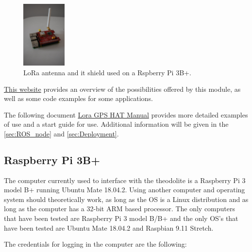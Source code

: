 \documentclass[10pt,letterpaper,oneside]{article}
\begin{document}
\begin{figure}[htb]
	\centering
	\includegraphics[width=0.2\textwidth]{./figs/LoRa_antenna.JPG}
	\caption{LoRa antenna and it shield used on a Rspberry Pi 3B+.}
	\label{fig:LORA}
\end{figure}

\href{https://wiki.dragino.com/index.php?title=Lora/GPS_HAT}{This website} provides an overview of the possibilities offered by this module, as well as some code examples for some applications.

The following document \href{run:Lora_gps_hat_manual.pdf}{Lora GPS HAT Manual} provides more detailed examples of use and a start guide for use.
Additional information will be given in the \autoref{sec:ROS_node} and \autoref{sec:Deployment}.

%

\subsection{Raspberry Pi 3B+}

The computer currently used to interface with the theodolite is a Raspberry Pi 3 model B+ running Ubuntu Mate 18.04.2. 
Using another computer and operating system should theoretically work, as long as the OS is a Linux distribution and as long as the computer has a 32-bit ARM based processor. 
The only computers that have been tested are Raspberry Pi 3 model B/B+ and the only OS's that have been tested are Ubuntu Mate 18.04.2 and Raspbian 9.11 Stretch.

The credentials for logging in the computer are the following:
\end{document}
